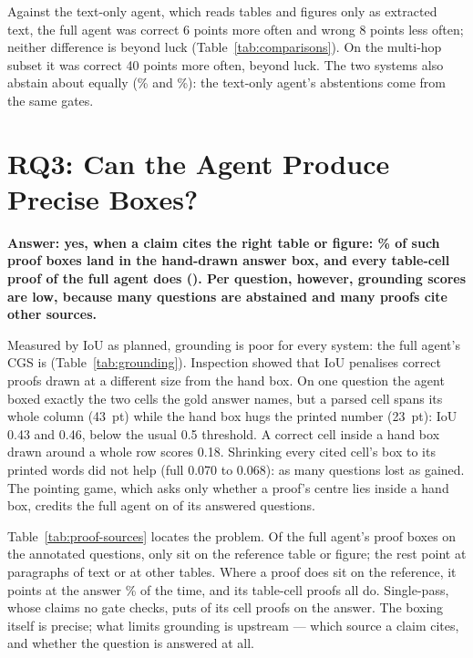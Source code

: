 Against the text-only agent, which reads tables and figures only as extracted text,
the full agent was correct 6 points more often and wrong 8 points less often; neither
difference is beyond luck (Table~\ref{tab:comparisons}). On the multi-hop subset it was
correct 40 points more often, beyond luck. The two systems also abstain about equally
(\nFullAbstain\% and \nTOAbstain\%): the text-only agent's abstentions come from the same
gates.

\section{RQ3: Can the Agent Produce Precise Boxes?}
\label{sec:rq3}

\textbf{Answer: yes, when a claim cites the right table or figure: \nProofInsideFull\%
of such proof boxes land in the hand-drawn answer box, and every table-cell proof of
the full agent does (\nCellsFull). Per question, however, grounding scores are low,
because many questions are abstained and many proofs cite other sources.}



Measured by IoU as planned, grounding is poor for every system: the full agent's CGS
is \nCGSFull{} (Table~\ref{tab:grounding}). Inspection showed that IoU penalises correct
proofs drawn at a different size from the hand box. On one question the agent boxed
exactly the two cells the gold answer names, but a parsed cell spans its whole column
(43~pt) while the hand box hugs the printed number (23~pt): IoU 0.43 and 0.46, below
the usual 0.5 threshold. A correct cell inside a hand box drawn around a whole row
scores 0.18. Shrinking every cited cell's box to its printed words did not help
(full 0.070 to 0.068): as many questions lost as gained. The pointing game, which asks
only whether a proof's centre lies inside a hand box, credits the full agent on
\nPointFullAns{} of its answered questions.



Table~\ref{tab:proof-sources} locates the problem. Of the full agent's \nProofBoxesFull{}
proof boxes on the annotated questions, only \nProofOnRefFull{} sit on the reference table
or figure; the rest point at paragraphs of text or at other tables. Where a proof does
sit on the reference, it points at the answer \nProofInsideFull\% of the time, and its
table-cell proofs all do. Single-pass, whose claims no gate checks, puts \nCellsSP{} of
its cell proofs on the answer. The boxing itself is precise; what limits grounding is
upstream --- which source a claim cites, and whether the question is answered at all.

